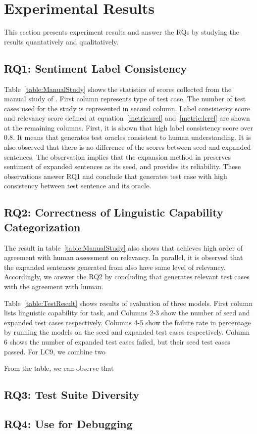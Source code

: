 \section{Experimental Results}
\label{sec:result}

This section presents experiment results and answer the RQs by
studying the results quantatively and qualitatively.


\subsection{RQ1: \tool Sentiment Label Consistency}
Table~\ref{table:ManualStudy} shows the statistics of scores collected
from the manual study of \tool. First column represents type of test
case. The number of test cases used for the study is represented in
second column. Label consistency score and \lc relevancy score defined
at equation~\ref{metric:srel} and~\ref{metric:lcrel} are shown at the
remaining columns. First, it is shown that high label consistency
score over 0.8. It means that \tool generates test oracles consistent
to human understanding. It is also observed that there is no
difference of the scores between seed and expanded sentences. The
observation implies that the expansion method in \tool preserves
sentiment of expanded sentences as its seed, and provides its
reliability. These observations answer RQ1 and conclude that \tool
generates test case with high consistency between test sentence and
its oracle.

\subsection{RQ2: Correctness of Linguistic Capability Categorization}
The result in table~\ref{table:ManualStudy} also shows that \tool
achieves high order of agreement with human assessment on \lc
relevancy. In parallel, it is observed that the expanded sentences
generated from \tool also have same level of \lc
relevancy. Accordingly, we answer the RQ2 by concluding that
\tool generates \lc relevant test cases with the agreement with human.

 Table~\ref{table:TestResult} shows
results of evaluation of three \sa models. First column lists
linguistic capability for \sa task, and Columns 2-3 show the number of
seed and expanded test cases respectively. Columns 4-5 show the
failure rate in percentage by running the \sa models on the seed and
expanded test cases respectively. Column 6 shows the number of
expanded test cases failed, but their seed test cases passed. For LC9,
we combine two 

From the
table, we can observe that 

\subsection{RQ3: Test Suite Diversity}


\subsection{RQ4: Use \tool for Debugging}
